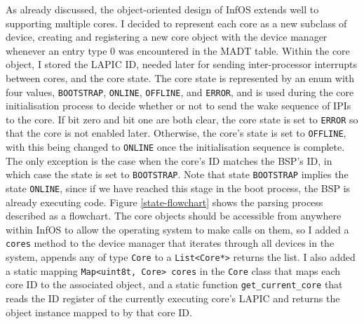 \documentclass[bsc,frontabs,singlespacing,parskip,deptreport]{infthesis}
\begin{document}
As already discussed, the object-oriented design of InfOS extends well to supporting multiple cores. I decided to represent each core as a new subclass of device, creating and registering a new core object with the device manager whenever an entry type 0 was encountered in the MADT table. Within the core object, I stored the LAPIC ID, needed later for sending inter-processor interrupts between cores, and the core state. The core state is represented by an enum with four values, \verb|BOOTSTRAP|, \verb|ONLINE|, \verb|OFFLINE|, and \verb|ERROR|, and is used during the core initialisation process to decide whether or not to send the wake sequence of IPIs to the core. If bit zero and bit one are both clear, the core state is set to \verb|ERROR| so that the core is not enabled later. Otherwise, the core's state is set to \verb|OFFLINE|, with this being changed to \verb|ONLINE| once the initialisation sequence is complete. The only exception is the case when the core's ID matches the BSP's ID, in which case the state is set to \verb|BOOTSTRAP|. Note that state \verb|BOOTSTRAP| implies the state \verb|ONLINE|, since if we have reached this stage in the boot process, the BSP is already executing code. Figure \ref{state-flowchart} shows the parsing process described as a flowchart. The core objects should be accessible from anywhere within InfOS to allow the operating system to make calls on them, so I added a \verb|cores| method to the device manager that iterates through all devices in the system, appends any of type \verb|Core| to a \verb|List<Core*>| returns the list. I also added a static mapping \verb|Map<uint8t, Core> cores| in the \verb|Core| class that maps each core ID to the associated object, and a static function \verb|get_current_core| that reads the ID register of the currently executing core's LAPIC and returns the object instance mapped to by that core ID.
\end{document}
